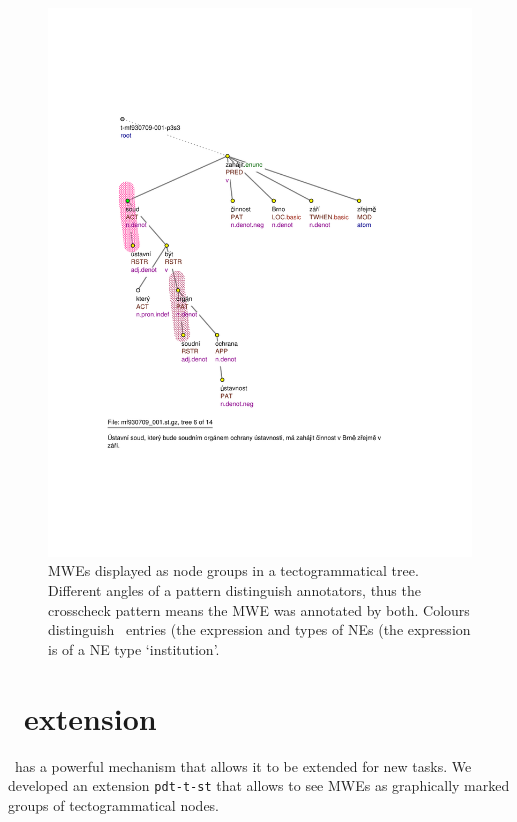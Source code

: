 \begin{figure}[htbp]
   \centering
   \includegraphics[width=\textwidth]{images/bubliny.pdf} 
   \caption{MWEs displayed as node groups in a tectogrammatical tree. Different angles of a pattern distinguish annotators, thus the crosscheck pattern means the MWE was annotated by both. Colours distinguish \semlex\ entries (the expression  and types of NEs (the expression  is of a NE type `institution'.}
   \label{fig:nodegroups}
\end{figure}

\todo


\section{\tred\ extension}
\label{sec:s:ext}

\tred\ has a powerful mechanism that allows it to be extended for new tasks. We developed an extension \texttt{pdt-t-st} that allows to see MWEs as graphically marked groups of tectogrammatical nodes. 

